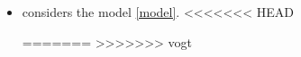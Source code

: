\documentclass[a4paper,12pt]{article}
\begin{document}
\begin{itemize}[label=--,leftmargin=0.5cm]
\item \cite*{Zhang2012} considers the model \eqref{model}.
<<<<<<< HEAD


=======
>>>>>>> vogt



\end{itemize}
\end{document}
